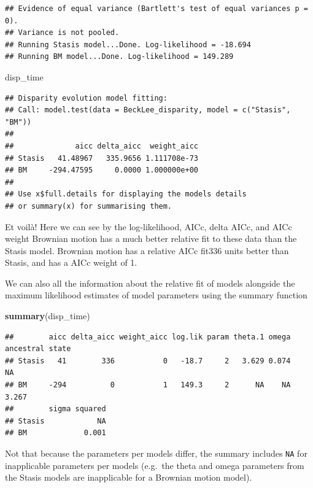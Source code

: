 \documentclass[
]{book}
\newenvironment{Shaded}{\begin{snugshade}}{\end{snugshade}}
\newcommand{\KeywordTok}[1]{\textcolor[rgb]{0.13,0.29,0.53}{\textbf{#1}}}
\newcommand{\NormalTok}[1]{#1}
\begin{document}
\begin{verbatim}
## Evidence of equal variance (Bartlett's test of equal variances p = 0).
## Variance is not pooled.
## Running Stasis model...Done. Log-likelihood = -18.694
## Running BM model...Done. Log-likelihood = 149.289
\end{verbatim}

\begin{Shaded}
\begin{Highlighting}[]
\NormalTok{disp\_time}
\end{Highlighting}
\end{Shaded}

\begin{verbatim}
## Disparity evolution model fitting:
## Call: model.test(data = BeckLee_disparity, model = c("Stasis", "BM")) 
## 
##              aicc delta_aicc  weight_aicc
## Stasis   41.48967   335.9656 1.111708e-73
## BM     -294.47595     0.0000 1.000000e+00
## 
## Use x$full.details for displaying the models details
## or summary(x) for summarising them.
\end{verbatim}

Et voilà! Here we can see by the log-likelihood, AICc, delta AICc, and AICc weight Brownian motion has a much better relative fit to these data than the Stasis model.
Brownian motion has a relative AICc fit336 units better than Stasis, and has a AICc weight of 1.

We can also all the information about the relative fit of models alongside the maximum likelihood estimates of model parameters using the summary function

\begin{Shaded}
\begin{Highlighting}[]
\KeywordTok{summary}\NormalTok{(disp\_time)}
\end{Highlighting}
\end{Shaded}

\begin{verbatim}
##        aicc delta_aicc weight_aicc log.lik param theta.1 omega ancestral state
## Stasis   41        336           0   -18.7     2   3.629 0.074              NA
## BM     -294          0           1   149.3     2      NA    NA           3.267
##        sigma squared
## Stasis            NA
## BM             0.001
\end{verbatim}

Not that because the parameters per models differ, the summary includes \texttt{NA} for inapplicable parameters per models (e.g.~the theta and omega parameters from the Stasis models are inapplicable for a Brownian motion model).
\end{document}
